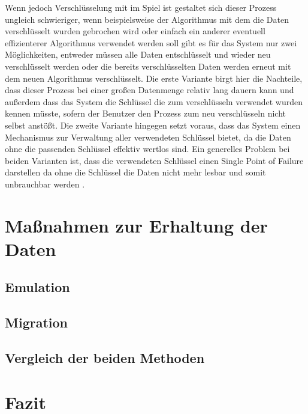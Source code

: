 \documentclass[conference,compsoc,final,a4paper]{IEEEtran}
\begin{document}
Wenn jedoch Verschlüsselung mit im Spiel ist gestaltet sich dieser Prozess ungleich schwieriger, wenn beispielsweise der Algorithmus mit dem die Daten verschlüsselt wurden gebrochen wird oder einfach ein anderer eventuell effizienterer Algorithmus verwendet werden soll gibt es für das System nur zwei Möglichkeiten, entweder müssen alle Daten entschlüsselt und wieder neu verschlüsselt werden oder die bereits verschlüsselten Daten werden erneut mit dem neuen Algorithmus verschlüsselt. Die erste Variante birgt hier die Nachteile, dass dieser Prozess bei einer großen Datenmenge relativ lang dauern kann und außerdem dass das System die Schlüssel die zum verschlüsseln verwendet wurden kennen müsste, sofern der Benutzer den Prozess zum neu verschlüsseln nicht selbst anstößt. Die zweite Variante hingegen setzt voraus, dass das System einen Mechanismus zur Verwaltung aller verwendeten Schlüssel bietet, da die Daten ohne die passenden Schlüssel effektiv wertlos sind. Ein generelles Problem bei beiden Varianten ist, dass die verwendeten Schlüssel einen Single Point of Failure darstellen da ohne die Schlüssel die Daten nicht mehr lesbar und somit unbrauchbar werden \autocite{Storer2006}.

\section{Maßnahmen zur Erhaltung der Daten}


\subsection{Emulation}


\subsection{Migration}


\subsection{Vergleich der beiden Methoden}


\section{Fazit}
\end{document}
